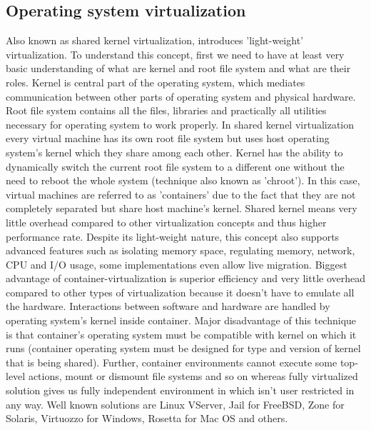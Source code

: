 \subsection{Operating system virtualization}
Also known as shared kernel virtualization, introduces 'light-weight' virtualization. To understand this concept, first we need to have at least very basic understanding of what are kernel and root file system and what are their roles. Kernel is central part of the operating system, which mediates communication between other parts of operating system and physical hardware. Root file system contains all the files, libraries and practically all utilities necessary for operating system to work properly. In shared kernel virtualization every virtual machine has its own root file system but uses host operating system's kernel which they share among each other. Kernel has the ability to dynamically switch the current root file system to a different one without the need to reboot the whole system (technique also known as 'chroot'). In this case, virtual machines are referred to as 'containers' due to the fact that they are not completely separated but share host machine's kernel. Shared kernel means very little overhead compared to other virtualization concepts and thus higher performance rate. Despite its light-weight nature, this concept also supports advanced features such as isolating memory space, regulating memory, network, CPU and I/O usage, some implementations even allow live migration. Biggest advantage of container-virtualization is superior efficiency and very little overhead compared to other types of virtualization because it doesn't have to emulate all the hardware. Interactions between software and hardware are handled by operating system's kernel inside container. Major disadvantage of this technique is that container's operating system must be compatible with kernel on which it runs (container operating system must be designed for type and version of kernel that is being shared). Further, container environments cannot execute some top-level actions, mount or dismount file systems and so on whereas fully virtualized solution gives us fully independent environment in which isn't user restricted in any way.
Well known solutions are Linux VServer, Jail for FreeBSD, Zone for Solaris, Virtuozzo for Windows, Rosetta for Mac OS and others.

